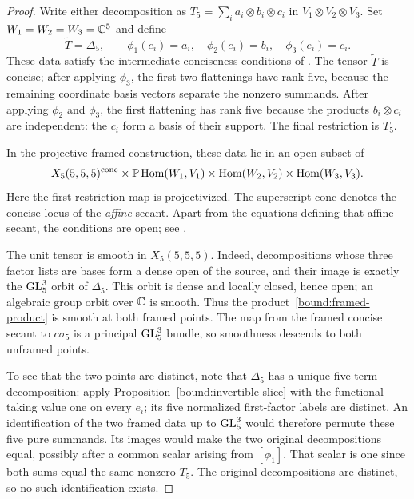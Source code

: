\begin{proof}
Write either decomposition as
$T_5=\sum_i a_i\otimes b_i\otimes c_i$ in $V_1\otimes V_2\otimes V_3$.
Set $W_1=W_2=W_3=\mathbb C^5$ and define
\[
 \widetilde T=\Delta_5,\qquad
 \phi_1(e_i)=a_i,\quad \phi_2(e_i)=b_i,\quad \phi_3(e_i)=c_i.
\]
These data satisfy the intermediate conciseness conditions of
\cite[Proposition~3.20]{JagiellaJelisiejew2026}. The tensor
$\widetilde T$ is concise; after applying $\phi_3$, the first two
flattenings have rank five, because the remaining coordinate basis
vectors separate the nonzero summands. After applying $\phi_2$ and
$\phi_3$, the first flattening has rank five because the products
$b_i\otimes c_i$ are independent: the $c_i$ form a basis of their
support. The final restriction is $T_5$.

In the projective framed construction, these data lie in an open
subset of
\begin{equation}\label{bound:framed-product}
 X_5(5,5,5)^{\mathrm{conc}}
 \times\mathbb P\operatorname{Hom}(W_1,V_1)
 \times\operatorname{Hom}(W_2,V_2)\times\operatorname{Hom}(W_3,V_3).
\end{equation}
Here the first restriction map is projectivized. The superscript
$\mathrm{conc}$ denotes the concise locus of the \emph{affine}
secant. Apart from the equations defining that affine secant, the
conditions are open; see
\cite[Proposition~3.20 and Theorem~3.25]{JagiellaJelisiejew2026}.

The unit tensor is smooth in $X_5(5,5,5)$. Indeed, decompositions whose
three factor lists are bases form a dense open of the source, and
their image is exactly the $\operatorname{GL}_5^3$ orbit of $\Delta_5$. This orbit
is dense and locally closed, hence open; an algebraic group orbit
over $\mathbb C$ is smooth. Thus the product~\eqref{bound:framed-product}
is smooth at both framed points. The map from the framed concise
secant to $c\sigma_5$ is a principal $\operatorname{GL}_5^3$ bundle, so smoothness
descends to both unframed points.

To see that the two points are distinct, note that $\Delta_5$ has a
unique five-term decomposition: apply
Proposition~\ref{bound:invertible-slice} with the functional taking
value one on every $e_i$; its five normalized first-factor labels are
distinct. An identification of the two framed data up to
$\operatorname{GL}_5^3$ would therefore permute these five pure summands. Its images
would make the two original decompositions equal, possibly after a
common scalar arising from $[\phi_1]$. That scalar is one since both
sums equal the same nonzero $T_5$. The original decompositions are
distinct, so no such identification exists.
\end{proof}

